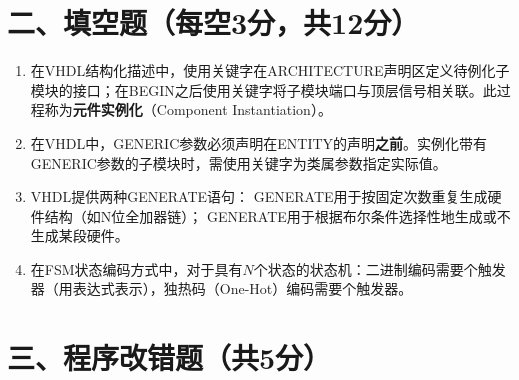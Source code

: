 \newpage

\section*{二、填空题（每空3分，共12分）}

\begin{enumerate}[label=\arabic*.]

\item 在VHDL结构化描述中，使用关键字\underline{\hspace{2.5cm}}在ARCHITECTURE声明区定义待例化子模块的接口；在BEGIN之后使用关键字\underline{\hspace{2.5cm}}将子模块端口与顶层信号相关联。此过程称为\textbf{元件实例化}（Component Instantiation）。

\vspace{0.6cm}

\item 在VHDL中，GENERIC参数必须声明在ENTITY的\underline{\hspace{2.5cm}}声明\textbf{之前}。实例化带有GENERIC参数的子模块时，需使用关键字\underline{\hspace{2.5cm}}为类属参数指定实际值。

\vspace{0.6cm}

\item VHDL提供两种GENERATE语句：\underline{\hspace{2.5cm}} GENERATE用于按固定次数重复生成硬件结构（如N位全加器链）；\underline{\hspace{2.5cm}} GENERATE用于根据布尔条件选择性地生成或不生成某段硬件。

\vspace{0.6cm}

\item 在FSM状态编码方式中，对于具有$N$个状态的状态机：二进制编码需要\underline{\hspace{2cm}}个触发器（用表达式表示），独热码（One-Hot）编码需要\underline{\hspace{2cm}}个触发器。

\end{enumerate}

\newpage

\section*{三、程序改错题（共5分）}

